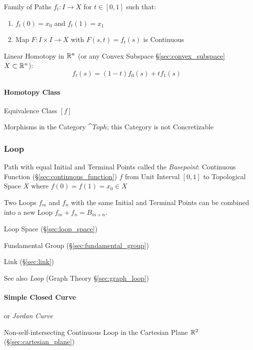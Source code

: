 Family of Paths $f_t : I \rightarrow X$ for $t \in [0,1]$ such that:
\begin{enumerate}
  \item $f_t(0) = x_0$ and $f_t(1) = x_1$
  \item Map $F : I \times I \rightarrow X$ with $F(s,t) = f_t(s)$ is
    Continuous
\end{enumerate}

Linear Homotopy in $\mathbb{R}^n$ (or any Convex Subspace
\S\ref{sec:convex_subspace} $X \subset \mathbb{R}^n$):
\[
  f_t(s) = (1 - t) f_0(s) + t f_1(s)
\]



\paragraph{Homotopy Class}\label{sec:homotopy_class}\hfill

Equivalence Class $[f]$

Morphisms in the Category $\cat{Toph}$; this Category is not
Concretizable



\subsubsection{Loop}\label{sec:loop}

Path with equal Initial and Terminal Points called the
\emph{Basepoint}: Continuous Function
(\S\ref{sec:continuous_function}) $f$ from Unit Interval $[0,1]$ to
Topological Space $X$ where $f(0) = f(1) = x_0 \in X$

Two Loops $f_m$ and $f_n$ with the same Initial and Terminal Points
can be combined into a new Loop $f_m + f_n = B_{m+n}$.
\cite{hatcher02}

Loop Space (\S\ref{sec:loop_space})

Fundamental Group (\S\ref{sec:fundamental_group})

Link (\S\ref{sec:link})

\fist See also \emph{Loop} (Graph Theory \S\ref{sec:graph_loop})



\paragraph{Simple Closed Curve}\label{sec:simple_closed_curve}\hfill

or \emph{Jordan Curve}

Non-self-intersecting Continuous Loop in the Cartesian Plane $\mathbb{R}^2$
(\S\ref{sec:cartesian_plane})


